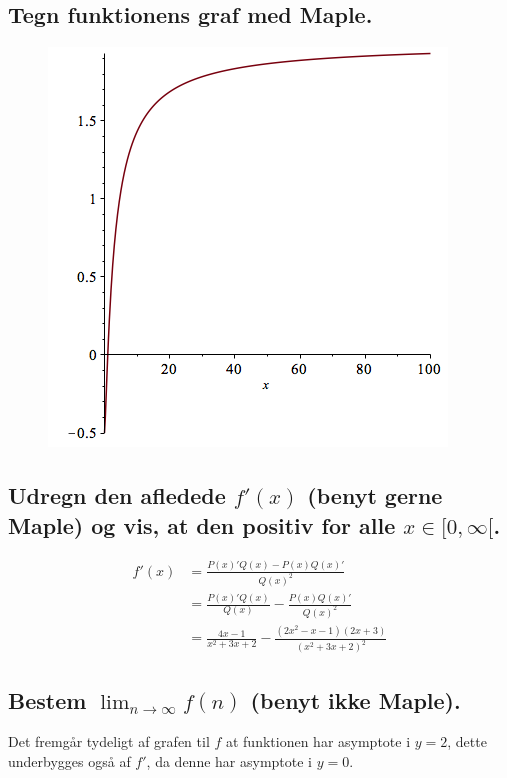 \documentclass[11pt,a4paper]{article}
\begin{document}
\subsection{\mdseries Tegn funktionens graf med Maple.}
\begin{figure}[H]
    \includegraphics[scale=1.0]{figures/2-2a-fig-1.png}
\end{figure}

\subsection{\mdseries Udregn den afledede $f'(x)$ (benyt gerne Maple) og vis,
    at den positiv for alle $x \in [0,\infty[$.}

\begin{align}
    f'(x) &= \frac{P(x)' Q(x) - P(x) Q(x)'}{Q(x)^2} \\
          &= \frac{P(x)' Q(x)}{Q(x)} - \frac{P(x) Q(x)'}{Q(x)^2} \\
          &= \frac{4x - 1}{x^2 + 3x + 2} -
             \frac{(2x^2 - x - 1) (2x + 3)}{(x^2 + 3x + 2)^2}
\end{align}

\subsection{\mdseries Bestem $\lim_{n \rightarrow \infty}f(n)$ (benyt ikke
    Maple).}
Det fremgår tydeligt af grafen til $f$ at funktionen har asymptote i $y = 2$,
dette underbygges også af $f'$, da denne har asymptote i $y = 0$.
\end{document}
